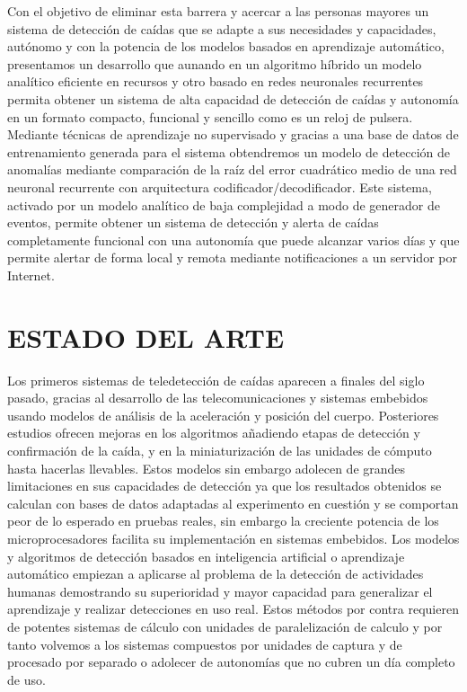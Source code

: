 \documentclass[11pt,a4paper,spanish,twocolumn]{article}
\begin{document}
Con el objetivo de eliminar esta barrera y acercar a las personas mayores un sistema de detección de caídas que se adapte a sus necesidades y capacidades, autónomo y con la potencia de los modelos basados en aprendizaje automático, presentamos un desarrollo que aunando en un algoritmo híbrido un modelo analítico eficiente en recursos y otro basado en redes neuronales recurrentes permita obtener un sistema de alta capacidad de detección de caídas y autonomía en un formato compacto, funcional y sencillo como es un reloj de pulsera. Mediante técnicas de aprendizaje no supervisado y gracias a una base de datos de entrenamiento generada para el sistema obtendremos un modelo de detección de anomalías mediante comparación de la raíz del error cuadrático medio de una red neuronal recurrente con arquitectura codificador/decodificador. Este sistema, activado por un modelo analítico de baja complejidad a modo de generador de eventos, permite obtener un sistema de detección y alerta de caídas completamente funcional con una autonomía que puede alcanzar varios días y que permite alertar de forma local y remota mediante notificaciones a un servidor por Internet.


\section{ESTADO DEL ARTE}
Los primeros sistemas de teledetección de caídas aparecen a finales del siglo pasado\cite{Williams1998}, gracias al desarrollo de las telecomunicaciones y sistemas embebidos usando modelos de análisis de la aceleración y posición del cuerpo. Posteriores estudios ofrecen mejoras en los algoritmos añadiendo etapas de detección y confirmación de la caída\cite{Chen2005,Bourke2008}, y en la miniaturización de las unidades de cómputo hasta hacerlas llevables\cite{fallindex00}. Estos modelos sin embargo adolecen de grandes limitaciones en sus capacidades de detección ya que los resultados obtenidos se calculan con bases de datos adaptadas al experimento en cuestión y se comportan peor de lo esperado en pruebas reales\cite{Bagala2012}, sin embargo la creciente potencia de los microprocesadores facilita su implementación en sistemas embebidos. Los modelos y algoritmos de detección basados en  inteligencia artificial o aprendizaje automático empiezan a aplicarse al problema de la detección de actividades humanas\cite{Noury2007,Ozdemir2014} demostrando su superioridad y mayor capacidad para generalizar el aprendizaje y realizar detecciones en uso real\cite{Aziz2017}. Estos métodos por contra requieren de potentes sistemas de cálculo con unidades de paralelización de calculo y por tanto volvemos a los sistemas compuestos por unidades de captura y de procesado por separado\cite{Ajerla2019} o adolecer de autonomías que no cubren un día completo de uso\cite{Liu2020}.
\end{document}
